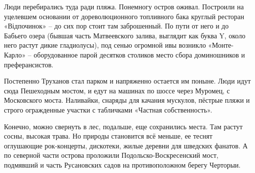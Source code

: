 Люди перебирались туда ради пляжа. Понемногу остров оживал. Построили на уцелевшем основании от дореволюционного топливного бака круглый ресторан «Відпочинок» – до сих пор стоит там заброшенный. По пути от него и до Бабьего озера (бывшая часть Матвеевского залива, выглядит как буква Y, около него растут дикие гладиолусы), под сенью огромной ивы возникло «Монте-Карло» – оборудованное парой десятков столиков место сбора доминошников и преферансистов.

Постепенно Труханов стал парком и напряженно остается им поныне. Люди идут сюда Пешеходным мостом, и едут на машинах по шоссе через Муромец, с Московского моста. Наливайки, снаряды для качания мускулов, пёстрые пляжи и строго огражденные участки с табличками «Частная собственность».

Конечно, можно свернуть в лес, подальше, еще сохранились места. Там растут сосны, высокая трава. Но природы становится всё меньше, ее теснят оглушающие рок-концерты, дискотеки, жилые деревни для шведских фанатов. А по северной части острова проложили Подольско-Воскресенский мост, подмявший и часть Русановских садов на противоположном берегу Черторыи.

